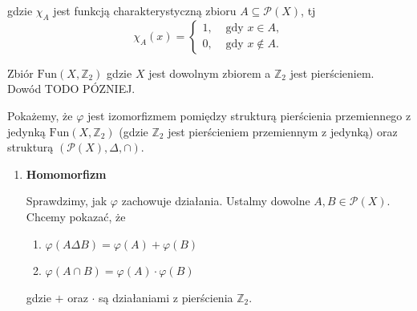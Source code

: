 \begin{solution}
\begin{enumerate}[label=\alph*)]
			 \begin{figure}[H] %
			        \centering
			\end{figure} 

			gdzie $\chi_{A}$ jest funkcją charakterystyczną zbioru $A \subseteq \mathcal{P}(X) $, tj
			\[
			\chi_{A}\left( x \right) = \begin{cases}
				1, &\text{ gdy } x \in A,\\
				0, &\text{ gdy } x \not\in A.
			\end{cases}
			\] 
			\begin{note}
			
				Zbiór $\text{Fun}\left( X, \mathbb{Z} _{2} \right) $ gdzie $X$ jest dowolnym zbiorem a $\mathbb{Z}_{2}$ jest pierścieniem. Dowód TODO PÓZNIEJ.
			\end{note}

			Pokażemy, że $\varphi$ jest izomorfizmem pomiędzy strukturą pierścienia przemiennego z jedynką $\text{Fun}\left( X, \mathbb{Z}_{2} \right) $ (gdzie $\mathbb{Z}_{2}$ jest pierścieniem  przemiennym z jedynką) oraz strukturą $\left( \mathcal{P}(X) , \Delta , \cap  \right) $.
			\begin{enumerate}[label=\arabic*)]
			\item \textbf{Homomorfizm} 
			
				\noindent Sprawdzimy, jak $\varphi$ zachowuje działania. Ustalmy dowolne $A, B \in \mathcal{P}(X) $. Chcemy pokazać, że
				\begin{enumerate}[label=\alph*)]
					\item $\varphi \left( A \Delta B \right) = \varphi\left( A \right) + \varphi \left( B \right)   $
					\item $\varphi \left( A \cap B \right) =  \varphi \left( A \right) \cdot \varphi \left( B \right)   $
				\end{enumerate}		
				gdzie $+$ oraz  $\cdot $ są działaniami z pierścienia $\mathbb{Z}_{2}$.
				

\end{enumerate}
\end{enumerate}
\end{solution}
